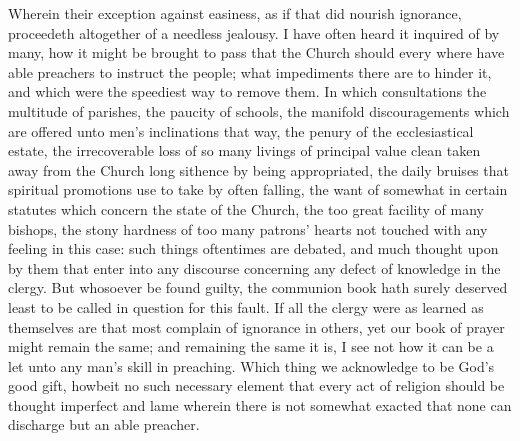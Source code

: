 Wherein their exception against easiness, as if that did nourish ignorance, proceedeth altogether of a needless jealousy. I have often heard it inquired of by many, how it might be brought to pass that the Church should every where have able preachers to instruct the people; what impediments there are to hinder it, and which were the speediest way to remove them. In which consultations the multitude of parishes, the paucity of schools, the manifold discouragements which are offered unto men’s inclinations that way, the penury of the ecclesiastical estate, the irrecoverable loss of so many livings of principal value clean taken away from the Church long sithence by being appropriated, the daily bruises that spiritual promotions use to take by often falling, the want of somewhat in certain statutes which concern the state of the Church, the too great facility of many bishops, the stony hardness of too many patrons’ hearts not touched with any feeling in this case: such things oftentimes are debated, and much thought upon by them that enter into any discourse concerning any defect of knowledge in the clergy. But whosoever be found guilty, the communion book hath surely deserved least to be called in question for this fault. If all the clergy were as learned as themselves are that most complain of ignorance in others, yet our book of prayer might remain the same; and remaining the same it is, I see not how it can be a let unto any man’s skill in preaching. Which thing we acknowledge to be God’s good gift, howbeit no such necessary element that every act of religion should be thought imperfect and lame wherein there is not somewhat exacted that none can discharge but an able preacher.


